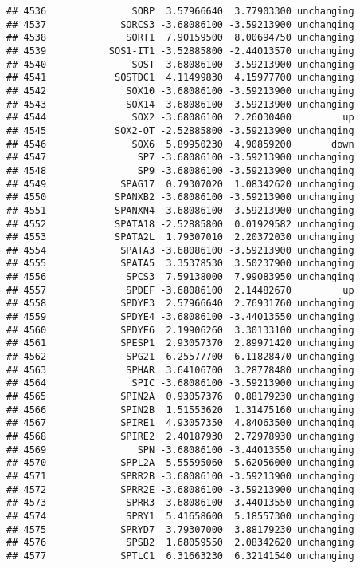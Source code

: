 \documentclass[]{article}
\begin{document}
\begin{verbatim}
## 4536               SOBP  3.57966640  3.77903300 unchanging
## 4537             SORCS3 -3.68086100 -3.59213900 unchanging
## 4538              SORT1  7.90159500  8.00694750 unchanging
## 4539           SOS1-IT1 -3.52885800 -2.44013570 unchanging
## 4540               SOST -3.68086100 -3.59213900 unchanging
## 4541            SOSTDC1  4.11499830  4.15977700 unchanging
## 4542              SOX10 -3.68086100 -3.59213900 unchanging
## 4543              SOX14 -3.68086100 -3.59213900 unchanging
## 4544               SOX2 -3.68086100  2.26030400         up
## 4545            SOX2-OT -2.52885800 -3.59213900 unchanging
## 4546               SOX6  5.89950230  4.90859200       down
## 4547                SP7 -3.68086100 -3.59213900 unchanging
## 4548                SP9 -3.68086100 -3.59213900 unchanging
## 4549             SPAG17  0.79307020  1.08342620 unchanging
## 4550            SPANXB2 -3.68086100 -3.59213900 unchanging
## 4551            SPANXN4 -3.68086100 -3.59213900 unchanging
## 4552            SPATA18 -2.52885800  0.01929582 unchanging
## 4553            SPATA2L  1.79307010  2.20372030 unchanging
## 4554             SPATA3 -3.68086100 -3.59213900 unchanging
## 4555             SPATA5  3.35378530  3.50237900 unchanging
## 4556              SPCS3  7.59138000  7.99083950 unchanging
## 4557              SPDEF -3.68086100  2.14482670         up
## 4558             SPDYE3  2.57966640  2.76931760 unchanging
## 4559             SPDYE4 -3.68086100 -3.44013550 unchanging
## 4560             SPDYE6  2.19906260  3.30133100 unchanging
## 4561             SPESP1  2.93057370  2.89971420 unchanging
## 4562              SPG21  6.25577700  6.11828470 unchanging
## 4563              SPHAR  3.64106700  3.28778480 unchanging
## 4564               SPIC -3.68086100 -3.59213900 unchanging
## 4565             SPIN2A  0.93057376  0.88179230 unchanging
## 4566             SPIN2B  1.51553620  1.31475160 unchanging
## 4567             SPIRE1  4.93057350  4.84063500 unchanging
## 4568             SPIRE2  2.40187930  2.72978930 unchanging
## 4569                SPN -3.68086100 -3.44013550 unchanging
## 4570             SPPL2A  5.55595060  5.62056000 unchanging
## 4571             SPRR2B -3.68086100 -3.59213900 unchanging
## 4572             SPRR2E -3.68086100 -3.59213900 unchanging
## 4573              SPRR3 -3.68086100 -3.44013550 unchanging
## 4574              SPRY1  5.41658600  5.18557300 unchanging
## 4575             SPRYD7  3.79307000  3.88179230 unchanging
## 4576              SPSB2  1.68059550  2.08342620 unchanging
## 4577             SPTLC1  6.31663230  6.32141540 unchanging

\end{verbatim}
\end{document}
